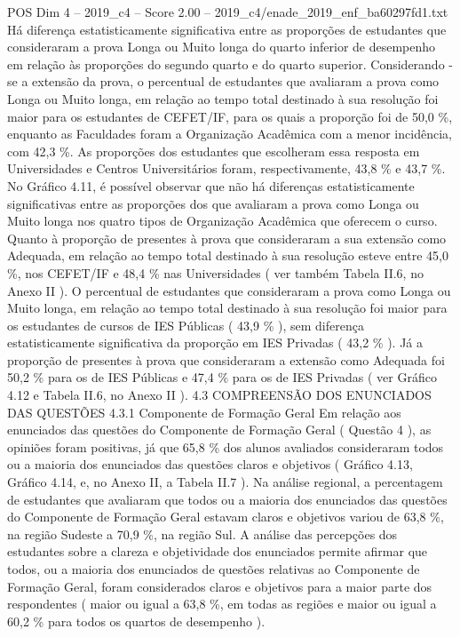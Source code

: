 \begin{textsample}{POS Dim 4 – 2019\_c4 – Score 2.00 – 2019\_c4/enade\_2019\_enf\_ba60297fd1.txt}
Há diferença estatisticamente significativa entre as proporções de estudantes que consideraram a prova Longa ou Muito longa do quarto inferior de desempenho em relação às proporções do segundo quarto e do quarto superior.
Considerando -se a extensão da prova, o percentual de estudantes que avaliaram a prova como Longa ou Muito longa, em relação ao tempo total destinado à sua resolução foi maior para os estudantes de CEFET/IF, para os quais a proporção foi de 50,0 \%, enquanto as Faculdades foram a Organização Acadêmica com a menor incidência, com 42,3 \%.
As proporções dos estudantes que escolheram essa resposta em Universidades e Centros Universitários foram, respectivamente, 43,8 \% e 43,7 \%.
No Gráfico 4.11, é possível observar que não há diferenças estatisticamente significativas entre as proporções dos que avaliaram a prova como Longa ou Muito longa nos quatro tipos de Organização Acadêmica que oferecem o curso.
Quanto à proporção de presentes à prova que consideraram a sua extensão como Adequada, em relação ao tempo total destinado à sua resolução esteve entre 45,0 \%, nos CEFET/IF e 48,4 \% nas Universidades ( ver também Tabela II.6, no Anexo II ).
O percentual de estudantes que consideraram a prova como Longa ou Muito longa, em relação ao tempo total destinado à sua resolução foi maior para os estudantes de cursos de IES Públicas ( 43,9 \% ), sem diferença estatisticamente significativa da proporção em IES Privadas ( 43,2 \% ).
Já a proporção de presentes à prova que consideraram a extensão como Adequada foi 50,2 \% para os de IES Públicas e 47,4 \% para os de IES Privadas ( ver Gráfico 4.12 e Tabela II.6, no Anexo II ). 4.3 COMPREENSÃO DOS ENUNCIADOS DAS QUESTÕES 4.3.1 Componente de Formação Geral Em relação aos enunciados das questões do Componente de Formação Geral ( Questão 4 ), as opiniões foram positivas, já que 65,8 \% dos alunos avaliados consideraram todos ou a maioria dos enunciados das questões claros e objetivos ( Gráfico 4.13, Gráfico 4.14, e, no Anexo II, a Tabela II.7 ).
Na análise regional, a percentagem de estudantes que avaliaram que todos ou a maioria dos enunciados das questões do Componente de Formação Geral estavam claros e objetivos variou de 63,8 \%, na região Sudeste a 70,9 \%, na região Sul.
A análise das percepções dos estudantes sobre a clareza e objetividade dos enunciados permite afirmar que todos, ou a maioria dos enunciados de questões relativas ao Componente de Formação Geral, foram considerados claros e objetivos para a maior parte dos respondentes ( maior ou igual a 63,8 \%, em todas as regiões e maior ou igual a 60,2 \% para todos os quartos de desempenho ).

\end{textsample}
